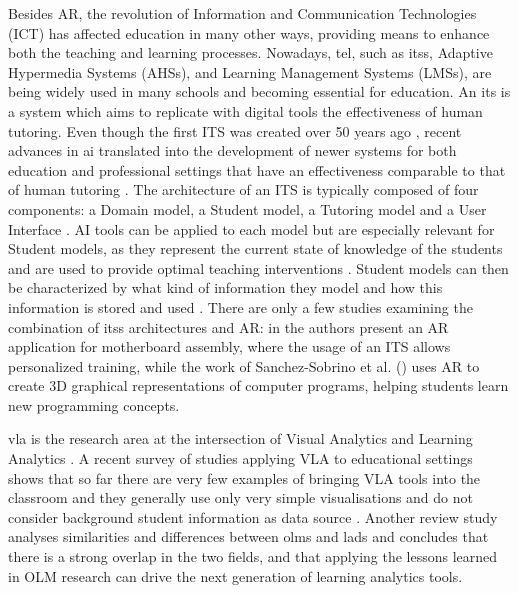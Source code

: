 Besides AR, the revolution of Information and Communication Technologies (ICT) has affected education in many other ways, providing means to enhance both the teaching and learning processes. Nowadays,  \gls{tel}, such as \glspl{its}, Adaptive
Hypermedia Systems (AHSs), and Learning Management Systems (LMSs), are being widely used in many  schools and becoming essential for education. 
An \gls{its} is a system which aims to replicate with digital tools the effectiveness of human tutoring. Even though the first ITS was created over 50 years ago \citep{carbonell1970ai}, recent advances in \gls{ai} translated into the development of newer systems for both education and professional settings \citep{mousavinasab2021intelligent} that have an effectiveness comparable to that of human tutoring \citep{doi:10.1080/00461520.2011.611369}. The architecture of an ITS is typically composed of four components: a Domain model, a Student model, a Tutoring model and a User Interface \citep{nkambou2010advances}. AI tools can be applied to each model but are especially relevant for Student models, as they represent the current state of knowledge of the students and are used to provide optimal teaching interventions \citep{SEDLMEIER20017674}. Student models can then be characterized by what kind of information they model and how this information is stored and used \citep{CHRYSAFIADI20134715}. There are only a few studies examining the combination of \glspl{its} architectures and AR: in \cite{westerfield2015intelligent} the authors present an AR application for motherboard assembly, where the usage of an ITS allows personalized training, while the work of Sanchez-Sobrino et al. (\citeyear{app10041518}) uses AR to create 3D graphical representations of computer programs, helping students learn new programming concepts.

\gls{vla} is the research area at the intersection of Visual Analytics and Learning Analytics \citep{Theron2020}. A recent survey of studies applying VLA to educational settings shows that so far there are very few examples of bringing VLA tools into the classroom and they generally use only very simple visualisations and do not consider background student information as data source \citep{VIEIRA2018119}. Another review study \citep{bodily2018open} analyses similarities and differences between \glspl{olm} and \glspl{lad} and concludes that there is a strong overlap in the two fields, and that applying the lessons learned in OLM research can drive the next generation of learning analytics tools. 

